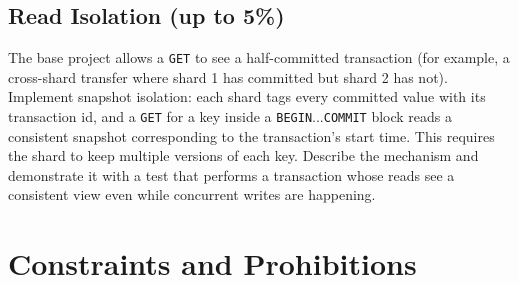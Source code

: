 \documentclass[11pt,a4paper]{article}
\begin{document}
\subsection{Read Isolation (up to 5\%)}
The base project allows a \texttt{GET} to see a half-committed transaction (for example, a cross-shard transfer where shard 1 has committed but shard 2 has not). Implement snapshot isolation: each shard tags every committed value with its transaction id, and a \texttt{GET} for a key inside a \texttt{BEGIN}...\texttt{COMMIT} block reads a consistent snapshot corresponding to the transaction's start time. This requires the shard to keep multiple versions of each key. Describe the mechanism and demonstrate it with a test that performs a transaction whose reads see a consistent view even while concurrent writes are happening.

\section{Constraints and Prohibitions}
\end{document}
